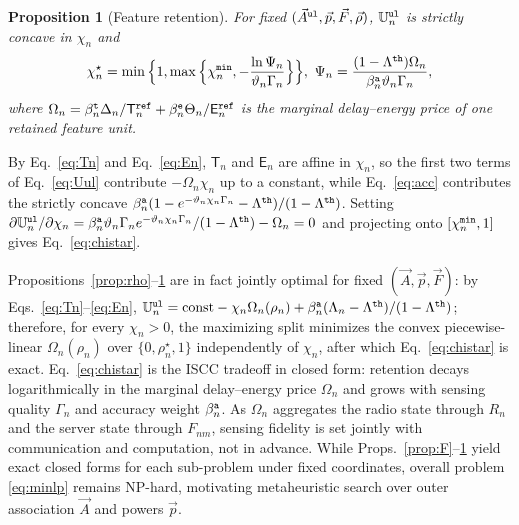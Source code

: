 \documentclass[journal]{IEEEtran}
\newtheorem{proposition}{Proposition}
\begin{document}
\begin{proposition}[Feature retention]\label{prop:chi}
For fixed $(\vec{A}^{\tt ul},\vec{p},\vec{F},\vec{\rho})$, $\mathbb{U}_n^{\tt ul}$ is strictly concave in $\chi_n$ and
\begin{equation}
\chi_n^\star
=\min\Big\{1,\max\Big\{\chi_n^{\tt min},-\frac{\ln\Psi_n}{\vartheta_n \Gamma_n}\Big\}\Big\},
\ 
\Psi_n=\frac{(1-\Lambda^{\tt th})\Omega_n}{\beta_n^{\tt a}\vartheta_n \Gamma_n},
\label{eq:chistar}
\end{equation}
where $\Omega_n=\beta_n^{\tt t}\Delta_n/\mathsf{T}_n^{\tt ref}+\beta_n^{\tt e}\Theta_n/\mathsf{E}_n^{\tt ref}$ is the marginal delay--energy price of one retained feature unit.
\end{proposition}
\begin{IEEEproof}
By Eq.~\eqref{eq:Tn} and Eq.~\eqref{eq:En}, $\mathsf{T}_n$ and $\mathsf{E}_n$ are affine in $\chi_n$, so the first two terms of Eq.~\eqref{eq:Uul} contribute $-\Omega_n\chi_n$ up to a constant, while Eq.~\eqref{eq:acc} contributes the strictly concave $\beta_n^{\tt a}(1-e^{-\vartheta_n\chi_n \Gamma_n}-\Lambda^{\tt th})/(1-\Lambda^{\tt th})$. Setting $\partial\mathbb{U}_n^{\tt ul}/\partial\chi_n=\beta_n^{\tt a}\vartheta_n \Gamma_n e^{-\vartheta_n\chi_n \Gamma_n}/(1-\Lambda^{\tt th})-\Omega_n=0$ and projecting onto $[\chi_n^{\tt min},1]$ gives Eq.~\eqref{eq:chistar}.
\end{IEEEproof}
Propositions~\ref{prop:rho}--\ref{prop:chi} are in fact jointly optimal for fixed $(\vec{A},\vec{p},\vec{F})$: by Eqs.~\eqref{eq:Tn}--\eqref{eq:En}, $\mathbb{U}_n^{\tt ul}=\mathrm{const}-\chi_n\Omega_n(\rho_n)+\beta_n^{\tt a}(\Lambda_n-\Lambda^{\tt th})/(1-\Lambda^{\tt th})$; therefore, for every $\chi_n>0$, the maximizing split minimizes the convex piecewise-linear $\Omega_n(\rho_n)$ over $\{0,\rho_n^\star,1\}$ independently of $\chi_n$, after which Eq.~\eqref{eq:chistar} is exact. Eq.~\eqref{eq:chistar} is the ISCC tradeoff in closed form: retention decays logarithmically in the marginal delay--energy price $\Omega_n$ and grows with sensing quality $\Gamma_n$ and accuracy weight $\beta_n^{\tt a}$. As $\Omega_n$ aggregates the radio state through $R_n$ and the server state through $F_{nm}$, sensing fidelity is set jointly with communication and computation, not in advance.
{\color{blue}While Props.~\ref{prop:F}--\ref{prop:chi} yield exact closed forms for each sub-problem under fixed coordinates, overall problem \eqref{eq:minlp} remains NP-hard, motivating metaheuristic search over outer association $\vec{A}$ and powers $\vec{p}$.}
\end{document}
